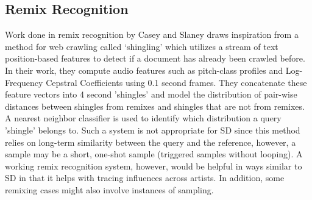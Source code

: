 \documentclass{article}
\begin{document}
\subsection{Remix Recognition}
Work done in remix recognition by Casey and Slaney \cite{caseyRemix} draws inspiration from a method for web crawling called `shingling' which utilizes a stream of text position-based features to detect if a document has already been crawled before. In their work, they compute audio features such as pitch-class profiles and Log-Frequency Cepstral Coefficients using 0.1 second frames. They concatenate these feature vectors into 4 second 'shingles' and model the distribution of pair-wise distances between shingles from remixes and shingles that are not from remixes. A nearest neighbor classifier is used to identify which distribution a query 'shingle' belongs to. Such a system is not appropriate for SD since this method relies on long-term similarity between the query and the reference, however, a sample may be a short, one-shot sample (triggered samples without looping).
A working remix recognition system, however, would be helpful in ways similar to SD in that it helps with tracing influences across artists. In addition, some remixing cases might also involve instances of sampling.
\end{document}
